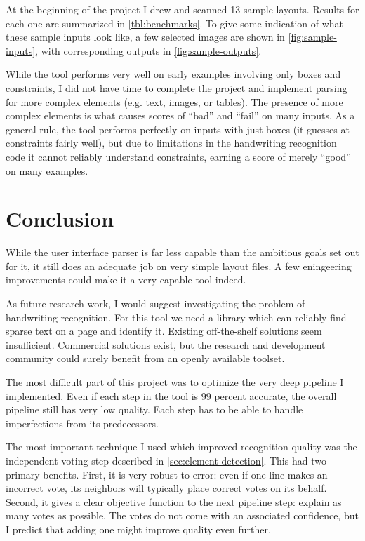 \documentclass{article}
\begin{document}
At the beginning of the project I drew and scanned 13 sample layouts. Results
for each one are summarized in \autoref{tbl:benchmarks}. To give some indication
of what these sample inputs look like, a few selected images are shown in
\autoref{fig:sample-inputs}, with corresponding outputs in
\autoref{fig:sample-outputs}.

While the tool performs very well on early examples involving only boxes and
constraints, I did not have time to complete the project and implement parsing
for more complex elements (e.g. text, images, or tables). The presence of more
complex elements is what causes scores of ``bad'' and ``fail'' on many inputs.
As a general rule, the tool performs perfectly on inputs with just boxes (it
guesses at constraints fairly well), but due to limitations in the handwriting
recognition code it cannot reliably understand constraints, earning a score of
merely ``good'' on many examples.

\section{Conclusion}

While the user interface parser is far less capable than the ambitious goals set
out for it, it still does an adequate job on very simple layout files. A few
eningeering improvements could make it a very capable tool indeed.

As future research work, I would suggest investigating the problem of
handwriting recognition. For this tool we need a library which can reliably find
sparse text on a page and identify it. Existing off-the-shelf solutions seem
insufficient. Commercial solutions exist, but the research and development
community could surely benefit from an openly available toolset.

The most difficult part of this project was to optimize the very deep pipeline I
implemented. Even if each step in the tool is 99 percent accurate, the overall
pipeline still has very low quality. Each step has to be able to handle
imperfections from its predecessors.

The most important technique I used which improved recognition quality was the
independent voting step described in \autoref{sec:element-detection}. This had
two primary benefits. First, it is very robust to error: even if one line makes
an incorrect vote, its neighbors will typically place correct votes on its
behalf. Second, it gives a clear objective function to the next pipeline step:
explain as many votes as possible. The votes do not come with an associated
confidence, but I predict that adding one might improve quality even further.

{}

\end{document}
